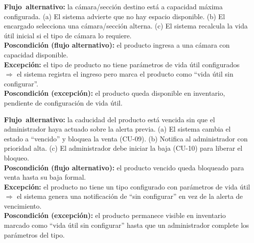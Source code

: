 \documentclass[11pt,a4paper]{article}
\begin{document}
\noindent\textbf{\mbox{Flujo alternativo}:} la cámara/sección destino está a capacidad máxima configurada. (a) El sistema advierte que no hay espacio disponible. (b) El encargado selecciona una cámara/sección alterna. (c) El sistema recalcula la vida útil inicial si el tipo de cámara lo requiere.\\
\textbf{Poscondición (flujo alternativo):} el producto ingresa a una cámara con capacidad disponible.\\
\noindent\textbf{\mbox{Excepción}:} el tipo de producto no tiene parámetros de vida útil configurados $\Rightarrow$ el sistema registra el ingreso pero marca el producto como ``vida útil sin configurar''.\\
\textbf{Poscondición (excepción):} el producto queda disponible en inventario, pendiente de configuración de vida útil.
\vspace{0.35cm}

\noindent\textbf{\mbox{Flujo alternativo}:} la caducidad del producto está vencida sin que el administrador haya actuado sobre la alerta previa. (a) El sistema cambia el estado a ``vencido'' y bloquea la venta (CU-09). (b) Notifica al administrador con prioridad alta. (c) El administrador debe iniciar la baja (CU-10) para liberar el bloqueo.\\
\textbf{Poscondición (flujo alternativo):} el producto vencido queda bloqueado para venta hasta su baja formal.\\
\noindent\textbf{\mbox{Excepción}:} el producto no tiene un tipo configurado con parámetros de vida útil $\Rightarrow$ el sistema genera una notificación de ``sin configurar'' en vez de la alerta de vencimiento.\\
\textbf{Poscondición (excepción):} el producto permanece visible en inventario marcado como ``vida útil sin configurar'' hasta que un administrador complete los parámetros del tipo.
\vspace{0.35cm}
\end{document}
